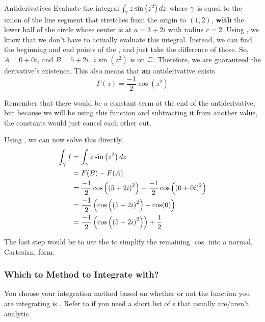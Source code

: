 \begin{example}[Lecture 7]{Antiderivatives}
  Evaluate the integral $\int_{\gamma} z \sin \left( z^{2} \right) dz$ where $\gamma$ is equal to the union of the line segment that stretches from the origin to $(1, 2)$, \textbf{with} the lower half of the circle whose center is at $a = 3+2i$ with radius $r = 2$.
  \tcblower{}
  Using , we know that we don't have to actually evaluate this integral.
  Instead, we can find the beginning and end points of the , and just take the difference of those.
  So, $A = 0+0i$, and $B = 5+2i$.
  $z \sin \left( z^{2} \right)$ is  on $\operatorname{\mathbb{C}}$.
  Therefore, we are guaranteed the derivative's existence.
  This also means that \textbf{an} antiderivative exists.
  \begin{equation*}
    F(z) = \frac{-1}{2} \cos \left( z^{2} \right)
  \end{equation*}

  Remember that there would be a constant term at the end of the antiderivative, but because we will be using this function and subtracting it from another value, the constants would just cancel each other out.

  Using , we can now solve this directly.
  \begin{align*}
    \int_{\gamma} f &= \int_{\gamma} z \sin \left( z^{2} \right) dz \\
                   &= F(B) - F(A) \\
                   &= \frac{-1}{2} \cos \left( {(5+2i)}^{2} \right) - \frac{-1}{2} \cos \left( {(0+0i)}^{2} \right) \\
                   &= \frac{-1}{2} \left( \cos \left( {(5+2i)}^{2} \right) - \cos(0) \right) \\
                   &= \frac{-1}{2} \left( \cos \left( {(5+2i)}^{2} \right) \right) + \frac{1}{2} \\
  \end{align*}

  The last step would be to use the  to simplify the remaining $\cos$ into a normal, Cartesian, form.
\end{example}

\subsubsection{Which to Method to Integrate with?}
You choose your integration method based on whether or not the function you are integrating is .
Refer to  if you need a short list of s that usually are/aren't analytic.

